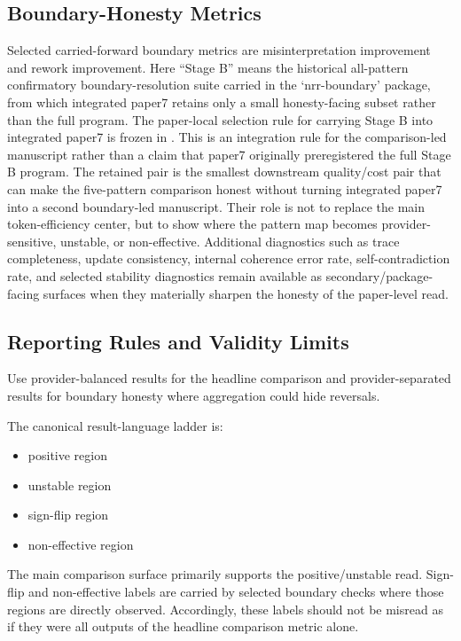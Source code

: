 \documentclass[11pt,a4paper]{article}
\begin{document}
\subsection{Boundary-Honesty Metrics}

Selected carried-forward boundary metrics are misinterpretation improvement and rework improvement. Here ``Stage B'' means the historical all-pattern confirmatory boundary-resolution suite carried in the `nrr-boundary' package, from which integrated paper7 retains only a small honesty-facing subset rather than the full program. The paper-local selection rule for carrying Stage B into integrated paper7 is frozen in . This is an integration rule for the comparison-led manuscript rather than a claim that paper7 originally preregistered the full Stage B program. The retained pair is the smallest downstream quality/cost pair that can make the five-pattern comparison honest without turning integrated paper7 into a second boundary-led manuscript. Their role is not to replace the main token-efficiency center, but to show where the pattern map becomes provider-sensitive, unstable, or non-effective. Additional diagnostics such as trace completeness, update consistency, internal coherence error rate, self-contradiction rate, and selected stability diagnostics remain available as secondary/package-facing surfaces when they materially sharpen the honesty of the paper-level read.

\subsection{Reporting Rules and Validity Limits}

Use provider-balanced results for the headline comparison and provider-separated results for boundary honesty where aggregation could hide reversals.

The canonical result-language ladder is:
\begin{itemize}
  \item positive region
  \item unstable region
  \item sign-flip region
  \item non-effective region
\end{itemize}

The main comparison surface primarily supports the positive/unstable read. Sign-flip and non-effective labels are carried by selected boundary checks where those regions are directly observed. Accordingly, these labels should not be misread as if they were all outputs of the headline comparison metric alone.
\end{document}
